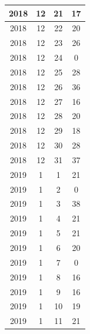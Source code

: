 \begin{longtable} {|c|c|c|c|}
\hline
2018         & 12           & 21           & 17                        \\ 
\hline
2018         & 12           & 22           & 20                        \\ 
\hline
2018         & 12           & 23           & 26                        \\ 
\hline
2018         & 12           & 24           & 0                         \\ 
\hline
2018         & 12           & 25           & 28                        \\ 
\hline
2018         & 12           & 26           & 36                        \\ 
\hline
2018         & 12           & 27           & 16                        \\ 
\hline
2018         & 12           & 28           & 20                        \\ 
\hline
2018         & 12           & 29           & 18                        \\ 
\hline
2018         & 12           & 30           & 28                        \\ 
\hline
2018         & 12           & 31           & 37                        \\ 
\hline
2019         & 1            & 1            & 21                        \\ 
\hline
2019         & 1            & 2            & 0                         \\ 
\hline
2019         & 1            & 3            & 38                        \\ 
\hline
2019         & 1            & 4            & 21                        \\ 
\hline
2019         & 1            & 5            & 21                        \\ 
\hline
2019         & 1            & 6            & 20                        \\ 
\hline
2019         & 1            & 7            & 0                         \\ 
\hline
2019         & 1            & 8            & 16                        \\ 
\hline
2019         & 1            & 9            & 16                        \\ 
\hline
2019         & 1            & 10           & 19                        \\ 
\hline
2019         & 1            & 11           & 21                        \\ 

\end{longtable}

